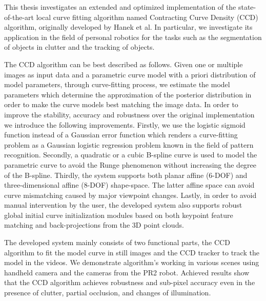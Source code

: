 This thesis investigates an extended and optimized
implementation of the state-of-the-art local curve fitting algorithm
named Contracting Curve Density (CCD) algorithm, originally developed 
by Hanek et al. In particular, we investigate its application  
in the field of personal robotics for the tasks such as the segmentation
of objects in clutter and the tracking of objects. 

The CCD algorithm can be best described as follows. Given one or multiple images as input
data and a parametric curve model with a priori distribution of model
parameters, through curve-fitting process, we estimate the model
parameters which determine the approximation of the posterior
distribution in order to make the curve models best matching the image data.
In order to improve the stability, accuracy and robustness over the original
implementation we introduce the following improvements. Firstly, we use the logistic sigmoid
function instead of a Gaussian error function which renders a
curve-fitting problem as a Gaussian logistic regression problem known in the
field of pattern recognition. Secondly, a quadratic or
a cubic B-spline curve is used to model the parametric curve
to avoid the Runge phenomenon without increasing the degree of the
B-spline. Thirdly, the system supports both planar affine (6-DOF) and
three-dimensional affine (8-DOF) shape-space. The latter affine space can avoid
curve mismatching caused by major viewpoint changes. Lastly, in
order to avoid manual intervention by the user, the developed system
also supports robust global initial curve initialization modules based on both keypoint
feature matching and back-projections from the 3D point clouds. 

The developed system mainly consists of two functional parts, the CCD
algorithm to fit the model curve in still images and the CCD tracker to
track the model in the videos. We demonstrate algorithm's working 
in various scenes using handheld camera and the cameras from the 
PR2 robot. Achieved results show that the CCD algorithm achieves 
robustness and sub-pixel accuracy even in the presence of clutter, 
partial occlusion, and changes of illumination. 












